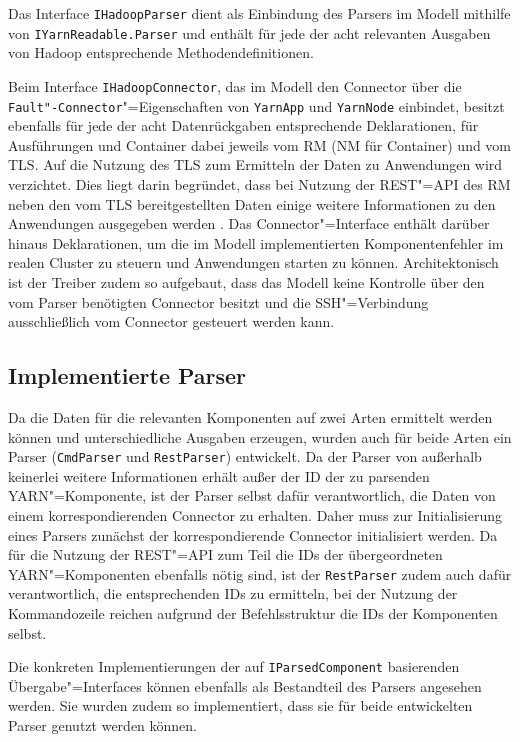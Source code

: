 Das Interface \texttt{IHadoopParser} dient als Einbindung des Parsers im Modell mithilfe von \texttt{IYarnReadable.Parser} und enthält für jede der acht relevanten Ausgaben von Hadoop entsprechende Methodendefinitionen.

Beim Interface \texttt{IHadoopConnector}, das im Modell den Connector über die \texttt{Fault"-Connector}"=Eigenschaften von \texttt{YarnApp} und \texttt{YarnNode} einbindet, besitzt ebenfalls für jede der acht Datenrückgaben entsprechende Deklarationen, für Ausführungen und Container dabei jeweils vom \ac{RM} (\ac{NM} für Container) und vom \ac{TLS}.
Auf die Nutzung des \ac{TLS} zum Ermitteln der Daten zu Anwendungen wird verzichtet.
Dies liegt darin begründet, dass bei Nutzung der REST"=API des \ac{RM} neben den vom \ac{TLS} bereitgestellten Daten einige weitere Informationen zu den Anwendungen ausgegeben werden \cite{HadoopRmApi271,HadoopYarnTlServer271}.
Das Connector"=Interface enthält darüber hinaus Deklarationen, um die im Modell implementierten Komponentenfehler im realen Cluster zu steuern und Anwendungen starten zu können.
Architektonisch ist der Treiber zudem so aufgebaut, dass das Modell keine Kontrolle über den vom Parser benötigten Connector besitzt und die SSH"=Verbindung ausschließlich vom Connector gesteuert werden kann.

\subsection{Implementierte Parser}\label{sec:implementedParsers}

Da die Daten für die relevanten Komponenten auf zwei Arten ermittelt werden können und unterschiedliche Ausgaben erzeugen, wurden auch für beide Arten ein Parser (\texttt{CmdParser} und \texttt{RestParser}) entwickelt.
Da der Parser von außerhalb keinerlei weitere Informationen erhält außer der ID der zu parsenden YARN"=Komponente, ist der Parser selbst dafür verantwortlich, die Daten von einem korrespondierenden Connector zu erhalten.
Daher muss zur Initialisierung eines Parsers zunächst der korrespondierende Connector initialisiert werden.
Da für die Nutzung der REST"=API zum Teil die IDs der übergeordneten YARN"=Komponenten ebenfalls nötig sind, ist der \texttt{RestParser} zudem auch dafür verantwortlich, die entsprechenden IDs zu ermitteln, bei der Nutzung der Kommandozeile reichen aufgrund der Befehlsstruktur die IDs der Komponenten selbst.

Die konkreten Implementierungen der auf \texttt{IParsedComponent} basierenden Übergabe"=Interfaces können ebenfalls als Bestandteil des Parsers angesehen werden.
Sie wurden zudem so implementiert, dass sie für beide entwickelten Parser genutzt werden können.

